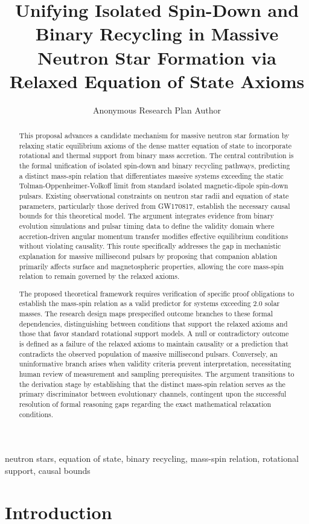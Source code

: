 \documentclass[conference]{IEEEtran}
\begin{document}
\title{Unifying Isolated Spin-Down and Binary Recycling in Massive Neutron Star Formation via Relaxed Equation of State Axioms}\author{Anonymous Research Plan Author}\maketitle

\begin{abstract}
This proposal advances a candidate mechanism for massive neutron star formation by relaxing static equilibrium axioms of the dense matter equation of state to incorporate rotational and thermal support from binary mass accretion. The central contribution is the formal unification of isolated spin-down and binary recycling pathways, predicting a distinct mass-spin relation that differentiates massive systems exceeding the static Tolman-Oppenheimer-Volkoff limit from standard isolated magnetic-dipole spin-down pulsars. Existing observational constraints on neutron star radii and equation of state parameters, particularly those derived from GW170817, establish the necessary causal bounds for this theoretical model. The argument integrates evidence from binary evolution simulations and pulsar timing data to define the validity domain where accretion-driven angular momentum transfer modifies effective equilibrium conditions without violating causality. This route specifically addresses the gap in mechanistic explanation for massive millisecond pulsars by proposing that companion ablation primarily affects surface and magnetospheric properties, allowing the core mass-spin relation to remain governed by the relaxed axioms.

The proposed theoretical framework requires verification of specific proof obligations to establish the mass-spin relation as a valid predictor for systems exceeding 2.0 solar masses. The research design maps prespecified outcome branches to these formal dependencies, distinguishing between conditions that support the relaxed axioms and those that favor standard rotational support models. A null or contradictory outcome is defined as a failure of the relaxed axioms to maintain causality or a prediction that contradicts the observed population of massive millisecond pulsars. Conversely, an uninformative branch arises when validity criteria prevent interpretation, necessitating human review of measurement and sampling prerequisites. The argument transitions to the derivation stage by establishing that the distinct mass-spin relation serves as the primary discriminator between evolutionary channels, contingent upon the successful resolution of formal reasoning gaps regarding the exact mathematical relaxation conditions.
\end{abstract}
\begin{IEEEkeywords}
neutron stars, equation of state, binary recycling, mass-spin relation, rotational support, causal bounds
\end{IEEEkeywords}\section{Introduction}
\end{document}
